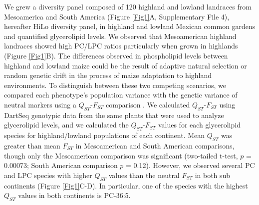 \documentclass[9pt,twocolumn,twoside,lineno]{BioRxiv}
\begin{document}
We grew a diversity panel composed of 120 highland and lowland landraces from Mesoamerica and South America (Figure \ref{Fig1}A, Supplementary File 4), hereafter HiLo diversity panel, in highland and lowland Mexican common gardens and quantified glycerolipid levels.    
We observed that Mesoamerican highland landraces showed  high PC/LPC ratios  particularly when grown in highlands (Figure \ref{Fig1}B).
The differences observed in phospholipid levels between highland and lowland maize could be the result of adaptive natural selection or random genetic drift in the process of maize adaptation to highland environments.
To distinguish between these two competing scenarios, we compared each phenotype’s population variance with the genetic variance of neutral markers using a $Q_{ST}$-$F_{ST}$ comparison \cite{Leinonen2013-ic}.
We calculated $Q_{ST}$-$F_{ST}$ using DartSeq genotypic data from the same plants that were used to analyze glycerolipid levels, and we calculated the $Q_{ST}$-$F_{ST}$ values for each glycerolipid species for highland/lowland populations of each continent. 
Mean $Q_{ST}$ was greater than mean $F_{ST}$ in Mesoamerican and South American comparisons, though only the Mesoamerican comparison was significant (two-tailed t-test, $p$ = 0.00073; South American comparison $p$ = 0.12).
However, we observed several PC and LPC species with higher $Q_{ST}$ values than the neutral $F_{ST}$ in both sub continents (Figure \ref{Fig1}C-D).
In particular, one of the species with the highest $Q_{ST}$ values in both continents is PC-36:5. 
\end{document}
